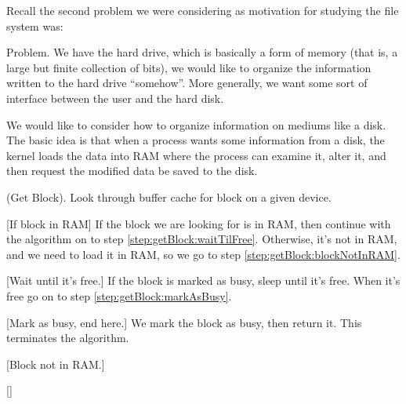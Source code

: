 
Recall the second problem we were considering as motivation for
studying the file system was:

\proclaim Problem. {We have the hard drive, which is basically a
  form of memory (that is, a large but finite collection of
  bits), we would like to organize the information written to the
  hard drive ``somehow''. More generally, we want some sort of
  interface between the user and the hard disk.}

\noindent\ignorespaces We would like to consider how to organize
information on mediums like a disk. The basic idea is that when
a process wants some information from a disk, the kernel loads
the data into RAM where the process can examine it, alter it, and
then request the modified data be saved to the disk.

\summary (Get Block). {Look through buffer cache for block on a given device.\label{alg:getBlock()}}
\begin{algorithm}
\item {[If block in RAM]} If the block we are looking for is in RAM, then continue with the algorithm on to step \ref{step:getBlock:waitTilFree}. Otherwise, it's not in RAM, and we need to load it in RAM, so we go to step \ref{step:getBlock:blockNotInRAM}.
\item\label{step:getBlock:waitTilFree} {[Wait until it's free.]} If the block is marked as busy, sleep until it's free. When it's free go on to step \ref{step:getBlock:markAsBusy}.
\item\label{step:getBlock:markAsBusy} {[Mark as busy, end here.]} We mark the block as busy, then return it. This terminates the algorithm.
\item\label{step:getBlock:blockNotInRAM} {[Block not in RAM.]} 
\item {[]}
\end{algorithm}

